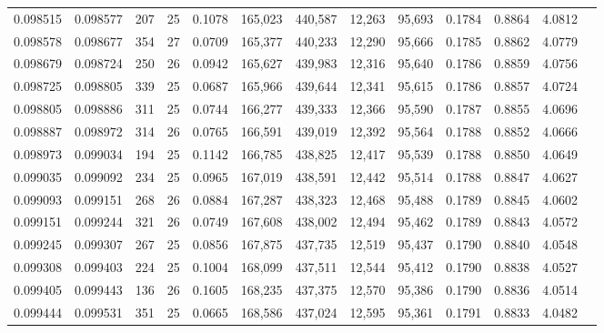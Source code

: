 \begin{tabular}{rrrrrrrrrrrrr}
0.098515 & 0.098577 & 207 &  25 &                                     0.1078 & 165,023 & 440,587 &  12,263 &  95,693 & 0.1784 & 0.8864 & 4.0812 \\
0.098578 & 0.098677 & 354 &  27 &                                     0.0709 & 165,377 & 440,233 &  12,290 &  95,666 & 0.1785 & 0.8862 & 4.0779 \\
0.098679 & 0.098724 & 250 &  26 &                                     0.0942 & 165,627 & 439,983 &  12,316 &  95,640 & 0.1786 & 0.8859 & 4.0756 \\
0.098725 & 0.098805 & 339 &  25 &                                     0.0687 & 165,966 & 439,644 &  12,341 &  95,615 & 0.1786 & 0.8857 & 4.0724 \\
0.098805 & 0.098886 & 311 &  25 &                                     0.0744 & 166,277 & 439,333 &  12,366 &  95,590 & 0.1787 & 0.8855 & 4.0696 \\
0.098887 & 0.098972 & 314 &  26 &                                     0.0765 & 166,591 & 439,019 &  12,392 &  95,564 & 0.1788 & 0.8852 & 4.0666 \\
0.098973 & 0.099034 & 194 &  25 &                                     0.1142 & 166,785 & 438,825 &  12,417 &  95,539 & 0.1788 & 0.8850 & 4.0649 \\
0.099035 & 0.099092 & 234 &  25 &                                     0.0965 & 167,019 & 438,591 &  12,442 &  95,514 & 0.1788 & 0.8847 & 4.0627 \\
0.099093 & 0.099151 & 268 &  26 &                                     0.0884 & 167,287 & 438,323 &  12,468 &  95,488 & 0.1789 & 0.8845 & 4.0602 \\
0.099151 & 0.099244 & 321 &  26 &                                     0.0749 & 167,608 & 438,002 &  12,494 &  95,462 & 0.1789 & 0.8843 & 4.0572 \\
0.099245 & 0.099307 & 267 &  25 &                                     0.0856 & 167,875 & 437,735 &  12,519 &  95,437 & 0.1790 & 0.8840 & 4.0548 \\
0.099308 & 0.099403 & 224 &  25 &                                     0.1004 & 168,099 & 437,511 &  12,544 &  95,412 & 0.1790 & 0.8838 & 4.0527 \\
0.099405 & 0.099443 & 136 &  26 &                                     0.1605 & 168,235 & 437,375 &  12,570 &  95,386 & 0.1790 & 0.8836 & 4.0514 \\
0.099444 & 0.099531 & 351 &  25 &                                     0.0665 & 168,586 & 437,024 &  12,595 &  95,361 & 0.1791 & 0.8833 & 4.0482 \\

\end{tabular}
